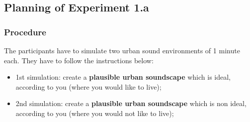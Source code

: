 \documentclass[twoside,twocolumn]{article}
\begin{document}
\subsection{Planning of Experiment 1.a}
\label{sec:xp1a_plan}

\subsubsection*{Procedure}

%
%
%
%
%

The participants have to simulate two urban sound environments of 1 minute each. They have to follow the instructions below:
\begin{itemize}
\item  1st simulation: create a \textbf{plausible urban soundscape} which is ideal, according to you (where you would like to live);
\item 2nd simulation: create a \textbf{plausible urban soundscape} which is non ideal, according to you (where you would not like to live);
\end{itemize}
\end{document}
